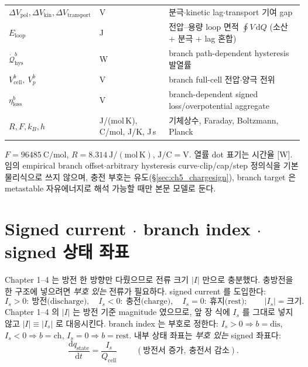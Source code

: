 \documentclass[11pt,a4paper]{article}
\newcommand{\dd}{\mathrm{d}}
\newcommand{\cell}{\mathrm{cell}}
\newcommand{\transp}{\mathrm{transport}}
\newcommand{\dis}{\mathrm{dis}}
\newcommand{\chg}{\mathrm{ch}}
\newcommand{\rst}{\mathrm{rest}}
\newcommand{\hys}{\mathrm{hys}}
\newcommand{\pol}{\mathrm{pol}}
\newcommand{\kin}{\mathrm{kin}}
\newcommand{\loss}{\mathrm{loss}}
\newcommand{\stt}{\mathrm{state}}
\begin{document}
\begin{longtable}{>{\raggedright\arraybackslash}p{} >{\raggedright\arraybackslash}p{} >{\raggedright\arraybackslash}p{}}
$\Delta V_\pol,\Delta V_\kin,\Delta V_\transp$ & V & 분극$\cdot$kinetic lag$\cdot$transport 기여 gap \\
$E_{\mathrm{loop}}$ & J & 전압--용량 loop 면적 $\oint V\,\dd Q$ (소산 + 분극 + lag 혼합) \\
$\dot{\mathcal Q}_{\hys}^b$ & W & branch path-dependent hysteresis 발열률 \\
$V_\cell^b,\ V_p^b$ & V & branch full-cell 전압$\cdot$양극 전위 \\
$\eta_\loss^b$ & V & branch-dependent signed loss/overpotential aggregate \\
$R,F,k_B,h$ & {\footnotesize J/(mol\,K), C/mol, J/K, J\,s} & 기체상수, Faraday, Boltzmann, Planck \\
\bottomrule
\end{longtable}
$F=96485\ \mathrm{C/mol}$, $R=8.314\ \mathrm{J/(mol\,K)}$, $\mathrm{J/C}=\mathrm V$. 열률 dot 표기는 시간율 [W].
임의 empirical branch offset$\cdot$arbitrary hysteresis curve$\cdot$clip/cap/step 정의식을 기본 물리식으로 쓰지
않으며, 충전 부호는 유도(\S\ref{sec:ch5_chargesign}), branch target 은 metastable 자유에너지로 해석 가능할 때만
본문 모델로 둔다.

\section{Signed current $\cdot$ branch index $\cdot$ signed 상태 좌표}\label{sec:ch5_signed}
Chapter 1--4 는 방전 한 방향만 다뤘으므로 전류 크기 $|I|$ 만으로 충분했다. 충방전을 한 구조에 넣으려면
\emph{부호 있는} 전류가 필요하다. signed current 를 도입한다:
\begin{equation}
I_s>0:\ \text{방전(discharge)},\quad I_s<0:\ \text{충전(charge)},\quad I_s=0:\ \text{휴지(rest)};\qquad |I_s|=\text{크기}.
\label{eq:ch5_signed_current}
\end{equation}
Chapter 1--4 의 $|I|$ 는 방전 기준 magnitude 였으므로, 앞 장 식에 $I_s$ 를 그대로 넣지 않고 $|I|\equiv|I_s|$ 로
대응시킨다. branch index 는 부호로 정한다: $I_s>0\Rightarrow b=\dis$, $I_s<0\Rightarrow b=\chg$,
$I_s=0\Rightarrow b=\rst$. 내부 상태 좌표는 \emph{부호 있는} signed 좌표다:
\begin{equation}
\boxed{\;\frac{\dd q_\stt}{\dd t}=\frac{I_s}{Q_\cell}\;}\qquad(\text{방전서 증가},\ \text{충전서 감소}).
\label{eq:ch5_qstate}
\end{equation}
\end{document}
